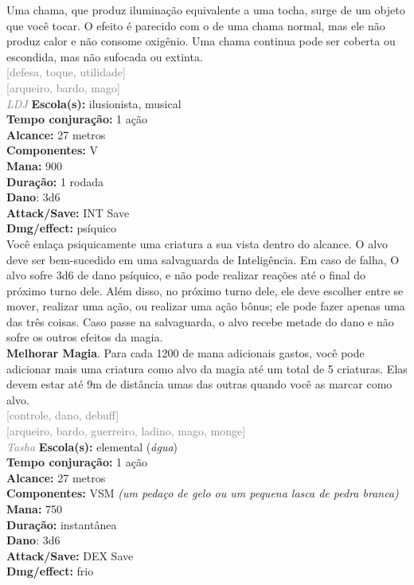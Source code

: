 \documentclass{RPG_Adventure}[2021/10/20]
\begin{document}
{\normalsize Uma chama, que produz iluminação equivalente a uma tocha, surge de um objeto que você tocar. O efeito é parecido com o de uma chama normal, mas ele não produz calor e não consome oxigênio. Uma chama continua pode ser coberta ou escondida, mas não sufocada ou extinta.\\}
{\scriptsize \textcolor{gray}{[defesa, toque, utilidade]\\}}
{\scriptsize \textcolor{gray}{[arqueiro, bardo, mago]\\}}
{\tiny \textcolor{gray}{\textit{LDJ}}}
{\small \t \textbf{Escola(s):} ilusionista, musical\\\t \textbf{Tempo conjuração:} 1 ação\\\t \textbf{Alcance:} 27 metros\\\t \textbf{Componentes:} V\\\t \textbf{Mana:} 900\\\t \textbf{Duração:} 1 rodada\\\t \textbf{Dano}: 3d6\\\t \textbf{Attack/Save:} INT Save\\\t \textbf{Dmg/effect:} psíquico\\}
{\normalsize Você enlaça psiquicamente uma criatura a sua vista dentro do alcance. O alvo deve ser bem-sucedido em uma salvaguarda de Inteligência. Em caso de falha, O alvo sofre 3d6 de dano psíquico, e não pode realizar reações até o final do próximo turno dele. Além disso, no próximo turno dele, ele deve escolher entre se mover, realizar uma ação, ou realizar uma ação bônus; ele pode fazer apenas uma das três coisas. Caso passe na salvaguarda, o alvo recebe metade do dano e não sofre os outros efeitos da magia.\\\t \textbf{Melhorar Magia}. Para cada 1200 de mana adicionais gastos, você pode adicionar mais uma criatura como alvo da magia até um total de 5 criaturas. Elas devem estar até 9m de distância umas das outras quando você as marcar como alvo.\\}
{\scriptsize \textcolor{gray}{[controle, dano, debuff]\\}}
{\scriptsize \textcolor{gray}{[arqueiro, bardo, guerreiro, ladino, mago, monge]\\}}
{\tiny \textcolor{gray}{\textit{Tasha}}}
{\small \t \textbf{Escola(s):} elemental (\textit{água})\\\t \textbf{Tempo conjuração:} 1 ação\\\t \textbf{Alcance:} 27 metros\\\t \textbf{Componentes:} VSM \textit{(um pedaço de gelo ou um pequena lasca de pedra branca)}\\\t \textbf{Mana:} 750\\\t \textbf{Duração:} instantânea\\\t \textbf{Dano}: 3d6\\\t \textbf{Attack/Save:} DEX Save\\\t \textbf{Dmg/effect:} frio\\}
\end{document}
